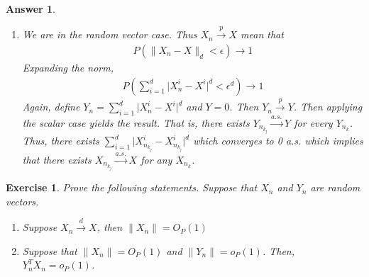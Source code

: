 \documentclass[12pt]{article}
\theoremstyle{colon}
\newtheorem{exercise}{Exercise}
\newtheorem*{answer}{Answer}
\begin{document}
\begin{answer}
\begin{enumerate}[label=\arabic*)]
    \item We are in the random vector case. Thus $X_n \xrightarrow{p} X$ mean that
      \begin{gather*}
        P(\lVert X_n - X \rVert_d < \epsilon) \rightarrow 1
      \end{gather*}
      Expanding the norm,
      \begin{gather*}
        P(\sum_{i = 1}^d \lvert X_n^i - X^i \rvert^d < \epsilon^d) \rightarrow 1
      \end{gather*}
      Again, define $Y_n = \sum_{i = 1}^d \lvert X_n^i - X^i \rvert^d$ and $Y = 0$. Then $Y_n \xrightarrow{p} Y$. Then applying the scalar case yields the result. That is, there exists $Y_{n_{k_j}} \xrightarrow{a.s.} Y$ for every $Y_{n_k}$. Thus, there exists $\sum_{i = 1}^d \lvert X_{n_{k_j}}^i - X_{n_{k_j}}^i \rvert^d$ which converges to 0 a.s. which implies that there exists $X_{n_{k_j}} \xrightarrow{a.s.} X$ for any $X_{n_k}$.
  \end{enumerate}
\end{answer}

\clearpage

\begin{exercise}
  Prove the following statements. Suppose that $X_n$ and $Y_n$ are random vectors.
  \begin{enumerate}[label=\arabic*)]
    \item Suppose $X_n \xrightarrow{d} X$, then $\lVert X_n \rVert = O_P(1)$
    \item Suppose that $\lVert X_n \rVert = O_P(1)$ and $\lVert Y_n \rVert = o_P(1)$. Then, $Y_n^T X_n = o_P(1)$.
  \end{enumerate}
\end{exercise}
\end{document}
